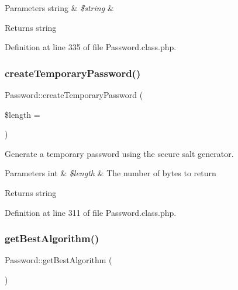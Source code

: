 \begin{DoxyParams}[1]{Parameters}
string & {\em \$string} & \\
\hline
\end{DoxyParams}
\begin{DoxyReturn}{Returns}
string 
\end{DoxyReturn}


Definition at line 335 of file Password.\+class.\+php.

\mbox{\label{classPassword_aef378e672d57dbe203242230c3cc45a9}} 
\subsubsection{\texorpdfstring{create\+Temporary\+Password()}{createTemporaryPassword()}}
{\footnotesize\ttfamily Password\+::create\+Temporary\+Password (\begin{DoxyParamCaption}\item[{}]{\$length = {} }\end{DoxyParamCaption})}



Generate a temporary password using the secure salt generator. 


\begin{DoxyParams}[1]{Parameters}
int & {\em \$length} & The number of bytes to return \\
\hline
\end{DoxyParams}
\begin{DoxyReturn}{Returns}
string 
\end{DoxyReturn}


Definition at line 311 of file Password.\+class.\+php.

\mbox{\label{classPassword_a191be9b3e77eea80b6d97b7bfaaba288}} 
\subsubsection{\texorpdfstring{get\+Best\+Algorithm()}{getBestAlgorithm()}}
{\footnotesize\ttfamily Password\+::get\+Best\+Algorithm (\begin{DoxyParamCaption}{ }\end{DoxyParamCaption})}



